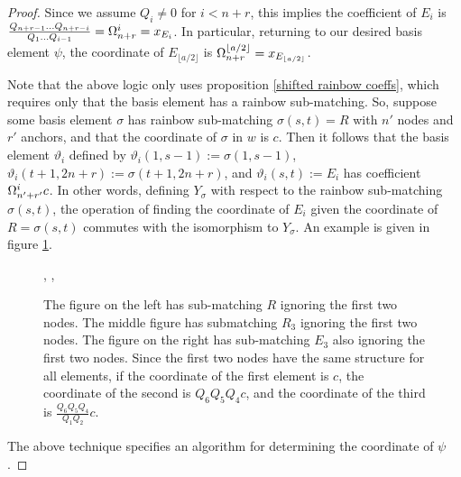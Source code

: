 \documentclass{amsart}
\begin{document}
\begin{proof}
 	Since we assume $Q_i\not=0$ for $i< n+r$, this implies the coefficient of $E_i$ is $\frac{Q_{n+r-1}...Q_{n+r-i}}{Q_1...Q_{i-1}}=\Omega^i_{n+r}=x_{E_i}$. In particular, returning to our desired basis element $\psi$, the coordinate of $E_{\lfloor a/2\rfloor}$ is $\Omega^{\lfloor a/2\rfloor}_{n+r}=x_{E_{\lfloor a/2\rfloor}}$.
 	
 	Note that the above logic only uses proposition \ref{shifted rainbow coeffs}, which requires only that the basis element has a rainbow sub-matching. So, suppose some basis element $\sigma$ has rainbow sub-matching $\sigma(s,t)=R$ with $n'$ nodes and $r'$ anchors, and that the coordinate of $\sigma$ in $w$ is $c$. Then it follows that the basis element $\vartheta_i$ defined by $\vartheta_i(1,s-1):=\sigma(1,s-1)$, $\vartheta_i(t+1,2n+r):=\sigma(t+1,2n+r)$, and $\vartheta_i(s,t):=E_i$ has coefficient $\Omega^i_{n'+r'}c$. In other words, defining $Y_\sigma$ with respect to the rainbow sub-matching $\sigma(s,t)$, the operation of finding the coordinate of $E_i$ given the coordinate of $R=\sigma(s,t)$ commutes with the isomorphism to $Y_\sigma$.  An example is given in figure \ref{kernel induct characterization example}.
 	
 	
 	\begin{figure}
 		\def\cbasisspacing{1mm}
 		\begin{adjustbox}{width=\textwidth}
 			, \hspace{\cbasisspacing}
 			, \hspace{\cbasisspacing}
 		\end{adjustbox}
 		
 		\caption{The figure on the left has sub-matching $R$ ignoring the first two nodes. The middle figure has submatching $R_3$ ignoring the first two nodes. The figure on the right has sub-matching $E_3$ also ignoring the first two nodes. Since the first two nodes have the same structure for all elements, if the coordinate of the first element is $c$, the coordinate of the second is $Q_6Q_5Q_4c$, and the coordinate of the third is $\frac{Q_6Q_5Q_4}{Q_1Q_2}c$.}
 		
 		\label{kernel induct characterization example}
 	\end{figure}
 	
 	\vspace{2mm}
 	The above technique specifies an algorithm for determining the coordinate of $\psi$. 
 	

\end{proof}
\end{document}
